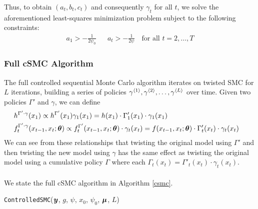 \documentclass{article}
\begin{document}
\noindent Thus, to obtain $(a_t, b_t, c_t)$ and consequently $\gamma_t$ for all $t$, we solve the aforementioned least-squares minimization problem subject to the following constraints:
\begin{align*}
a_1 > - \frac{1}{2\psi_0} & & a_t > -\frac{1}{2\psi} \quad \text{for all } t = 2, \ldots, T
\end{align*}

\subsubsection{Full cSMC Algorithm}
The full controlled sequential Monte Carlo algorithm iterates on twisted SMC for $L$ iterations, building a series of policies $\gamma^{\langle1\rangle}_{}, \gamma^{\langle2\rangle}_{}, \ldots, \gamma^{\langle L\rangle}_{}$  over time.    
Given two policies $\Gamma'$ and $\gamma$, we can define
\begin{align*}
&h^{\Gamma' \cdot \gamma}(x_1) \propto h^{\Gamma'}(x_1) \gamma_1(x_1) = h(x_1) \cdot {\Gamma'_1}(x_1) \cdot \gamma_1(x_1) & \\ 
& f^{\Gamma' \cdot \gamma}_t(x_{t-1}, x_{t}; \boldsymbol{\theta}) \propto f^{\Gamma'}_t(x_{t-1}, x_t; \boldsymbol{\theta}) \cdot \gamma_t(x_t) = f(x_{t-1}, x_t; \boldsymbol{\theta}) \cdot \Gamma'_t(x_t) \cdot \gamma_t(x_t)
\end{align*}
We can see from these relationships that twisting the original model using $\Gamma'$ and then twisting the new model using $\gamma$ has the same effect as twisting the original model using a cumulative policy $\Gamma$ where each $\Gamma_t(x_t) = \Gamma'_t(x_t) \cdot \gamma_t(x_t)$.  
\\
\\
\noindent We state the full cSMC algorithm in Algorithm \ref{csmc}.

\begin{algorithm}[H]
\caption{\texttt{ControlledSMC}($\boldsymbol{y}$, $g$, $\psi$, $x_0$, $\psi_0$, $\boldsymbol{\mu}$, $L$)} \label{csmc}
  \begin{algorithmic}[1]
   \end{algorithmic}
\end{algorithm}
\end{document}

